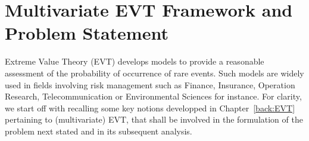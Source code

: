 \section{Multivariate EVT Framework and Problem Statement}
\label{jmva:sec:framework}
%
%

Extreme Value Theory (\textsc{EVT}) develops models to provide a reasonable
assessment of the probability of occurrence of rare events. Such models are widely used in fields
involving risk management such as Finance, Insurance, Operation Research, Telecommunication
or Environmental Sciences for instance. For clarity, we start off with recalling some key notions developped in Chapter~\ref{back:EVT} pertaining to (multivariate) \textsc{EVT}, that shall be involved in the formulation of the problem next stated and in its subsequent analysis. 


